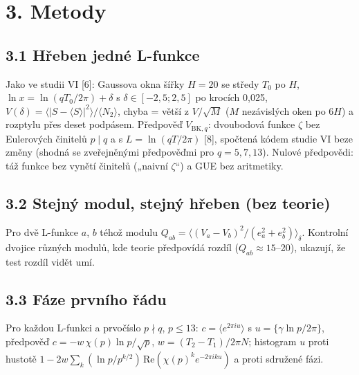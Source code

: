\documentclass[
  10pt,
]{article}
\begin{document}
\hypertarget{metody}{%
\section{3. Metody}\label{metody}}

\hypertarget{hux159eben-jednuxe9-l-funkce}{%
\subsection{3.1 Hřeben jedné
L-funkce}\label{hux159eben-jednuxe9-l-funkce}}

Jako ve studii VI {[}6{]}: Gaussova okna šířky \(H = 20\) se středy
\(T_0\) po \(H\), \(\ln x = \ln(qT_0/2\pi) + \delta\) s
\(\delta \in [-2{,}5; 2{,}5]\) po krocích 0,025,
\(V(\delta) = \langle|S - \langle S\rangle|^2\rangle/\langle N_2\rangle\),
chyba = větší z \(V/\sqrt M\) (\(M\) nezávislých oken po \(6H\)) a
rozptylu přes deset podpásem. Předpověď \(V_{\mathrm{BK},q}\):
dvoubodová funkce \(\zeta\) bez Eulerových činitelů \(p \mid q\) a s
\(L = \ln(qT/2\pi)\) {[}8{]}, spočtená kódem studie VI beze změny
(shodná se zveřejněnými předpověďmi pro \(q = 5, 7, 13\)). Nulové
předpovědi: táž funkce bez vynětí činitelů („naivní \(\zeta\)``) a GUE
bez aritmetiky.

\hypertarget{stejnuxfd-modul-stejnuxfd-hux159eben-bez-teorie}{%
\subsection{3.2 Stejný modul, stejný hřeben (bez
teorie)}\label{stejnuxfd-modul-stejnuxfd-hux159eben-bez-teorie}}

Pro dvě L-funkce \(a\), \(b\) téhož modulu
\(Q_{ab} = \langle (V_a - V_b)^2/(e_a^2 + e_b^2)\rangle_\delta\).
Kontrolní dvojice různých modulů, kde teorie předpovídá rozdíl
(\(Q_{ab} \approx 15\)--20), ukazují, že test rozdíl vidět umí.

\hypertarget{fuxe1ze-prvnuxedho-ux159uxe1du}{%
\subsection{3.3 Fáze prvního
řádu}\label{fuxe1ze-prvnuxedho-ux159uxe1du}}

Pro každou L-funkci a prvočíslo \(p \nmid q\), \(p \le 13\):
\(c = \langle e^{2\pi i u}\rangle\) s \(u = \{\gamma\ln p/2\pi\}\),
předpověď \(c = -w\,\chi(p)\ln p/\sqrt p\), \(w = (T_2 - T_1)/2\pi N\);
histogram \(u\) proti hustotě
\(1 - 2w\sum_k (\ln p/p^{k/2})\,\mathrm{Re}(\chi(p)^k e^{-2\pi i k u})\)
a proti sdružené fázi.
\end{document}
